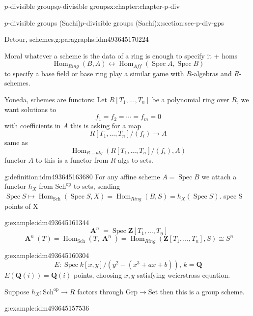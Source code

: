 \documentclass[oneside,10pt,]{book}
\numberwithin{equation}{section}
\newcommand{\lb}{[}
\newcommand{\rb}{]}
\newcommand{\ZZ}{\mathbf{Z}}
\newcommand{\QQ}{\mathbf{Q}}
\newcommand{\op}{\mathrm{op}}
\DeclareMathOperator{\Hom}{Hom}
\DeclareMathOperator{\Spec}{Spec}
\DeclareMathOperator{\aff}{\mathbf{A}}
\begin{document}
\begin{chapterptx}{\(p\)-divisible groups}{}{\(p\)-divisible groups}{}{}{x:chapter:chapter-p-div}
\begin{sectionptx}{\(p\)-divisible groups (Sachi)}{}{\(p\)-divisible groups (Sachi)}{}{}{x:section:sec-p-div-gps}
\begin{paragraphs}{Detour, schemes.}{g:paragraphs:idm493645170224}
%
\par
Moral whatever  a scheme is the data of a ring is enough to specify it + homs%
\begin{equation*}
\Hom_{Ring} (B,A) \leftrightarrow \Hom_{Aff}(\Spec A, \Spec B)
\end{equation*}
to specify a base field or base ring play a similar game with \(R\)-algebras and \(R\)-schemes.%
\par
Yoneda, schemes are functors: Let \(R\lb T_1,\ldots,T_n\rb \) be a polynomial ring over \(R\), we want solutions to%
\begin{equation*}
f_1=  f_2 = \cdots = f_m = 0
\end{equation*}
with coefficients in \(A\) this is asking for  a map%
\begin{equation*}
R\lb T_1, \ldots ,T_n] /(f_i) \to A
\end{equation*}
same as%
\begin{equation*}
\Hom_{R-alg} (R[T_1,\ldots, T_n] /(f_i), A)
\end{equation*}
functor \(A\) to this is a functor from \(R\)-algs to sets.%
\begin{definition}{}{g:definition:idm493645163680}%
For any affine scheme \(A = \Spec B\) we attach a functor \(h_X\) from \(\mathrm{Sch}^\op\) to sets, sending \(\Spec S \mapsto \Hom_{\mathrm{Sch}} (\Spec S, X) = \Hom_{Ring} (B,S) = h_X(\Spec S)\). spec S points of X%
\end{definition}
\begin{example}{}{g:example:idm493645161344}%
%
\begin{equation*}
\aff^n = \Spec \ZZ \lb T_1,\ldots, T_n\rb
\end{equation*}
%
\begin{equation*}
\aff^n(T) = \Hom_{\mathrm{Sch}} (T, \aff^n) = \Hom_{Ring}(\ZZ[T_1,\ldots, T_n], S)\cong S^n
\end{equation*}
%
\end{example}
\begin{example}{}{g:example:idm493645160304}%
%
\begin{equation*}
E \colon \Spec k[x,y] / (y^2 - (x^3 + ax +b)),\,k = \QQ
\end{equation*}
\(E(\QQ(i)) = \QQ(i)\) points, choosing \(x,y\) satisfying weierstrass equation.%
\end{example}
Suppose \(h_X \colon \mathrm{Sch}^\op \to R\) factors through \(\mathrm{Grp} \to \mathrm{Set}\) then this is a group scheme.%
\begin{example}{}{g:example:idm493645157536}%

\end{example}
\end{paragraphs}
\end{sectionptx}
\end{chapterptx}
\end{document}
